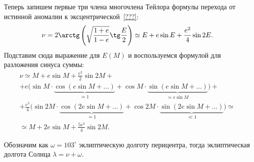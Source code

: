 Теперь запишем первые три члена многочлена Тейлора формулы перехода от истинной аномалии к эксцентрической~\eqref{???}:
\begin{equation*}
    \nu 
        = 2 \arctg \left(\sqrt{\frac{1+e}{1-e}} \tg \frac{E}{2} \right) 
        \simeq E + e \sin E + \frac{e^2}{4} \sin 2E.
\end{equation*}
Подставим сюда выражение для $E(M)$ и воспользуемся формулой для разложения синуса суммы:
\begin{multline*}
    \nu 
        \simeq M + e \sin M + \frac{e^2}{2} \sin 2M + \\
        + e \bigg( \sin M \cdot \underbrace{\cos (e \sin M + \ldots)}_{\simeq 1} + \cos M \cdot \underbrace{\sin ( e \sin M  + \ldots )}_{\simeq e \sin M} \bigg) + \\
        + \frac{e^2}{4} \bigg( \sin 2M \cdot \underbrace{\cos (2e \sin M + \ldots)}_{\simeq 1} + \cos 2M \cdot \underbrace{\sin (2e \sin M + \ldots)}_{\ll 1}\bigg)  \simeq \\
        \simeq M + 2e \sin M + \frac{5e^2}{4} \sin 2M.
\end{multline*}

Обозначим как $\omega = 103^\circ$ эклиптическую долготу перицентра, тогда эклиптическая долгота Солнца $\lambda = \nu + \omega$. 

